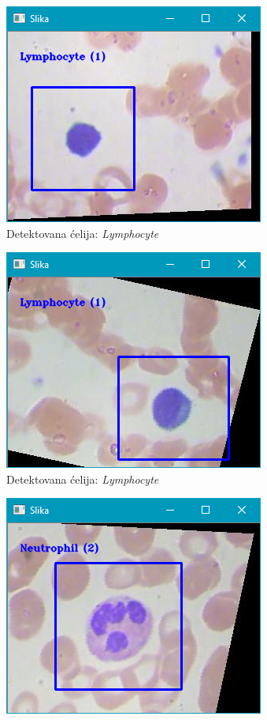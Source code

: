 \documentclass[12pt,a4paper]{article}
\begin{document}
\begin{figure}[H]
\begin{subfigure}{.5\textwidth}
  \centering
  \includegraphics[scale=.9]{slikaSlider1.png}
  \caption{Detektovana ćelija: \textit{Lymphocyte}}
\end{subfigure}
\begin{subfigure}{.5\textwidth}
  \centering
  \includegraphics[scale=.9]{slikaSlider2.png}
  \caption{Detektovana ćelija: \textit{Lymphocyte}}
\end{subfigure}
\begin{subfigure}{.5\textwidth}
  \centering
  \includegraphics[scale=.9]{slikaSlider3.png}

\end{subfigure}
\end{figure}
\end{document}
